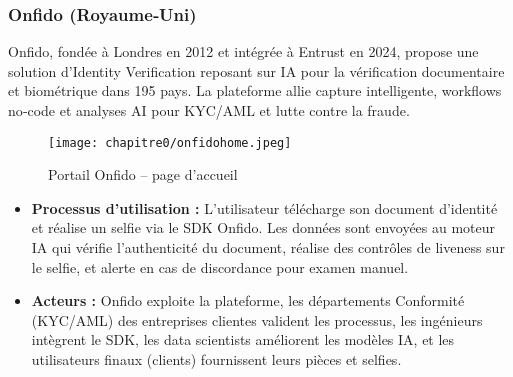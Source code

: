 \subsubsection{Onfido (Royaume‑Uni)}
Onfido\cite{b4,b36}, fondée à Londres en 2012 et intégrée à Entrust en 2024\cite{b37}, propose une solution d’Identity Verification reposant sur IA pour la vérification documentaire et biométrique dans 195 pays\cite{b36}. La plateforme allie capture intelligente, workflows no‑code et analyses AI pour KYC/AML et lutte contre la fraude\cite{b36}.\\
\begin{figure}[H]
  \centering
  \texttt{[image: chapitre0/onfidohome.jpeg]}
  \caption{Portail Onfido – page d’accueil}
\end{figure}
\begin{itemize}[label=\textbullet]
  \item \textbf{Processus d'utilisation :} L’utilisateur télécharge son document d’identité et réalise un selfie via le SDK Onfido\cite{b38}. Les données sont envoyées au moteur IA qui vérifie l’authenticité du document, réalise des contrôles de liveness sur le selfie, et alerte en cas de discordance pour examen manuel\cite{b37}.
  \item \textbf{Acteurs :} Onfido exploite la plateforme, les départements Conformité (KYC/AML) des entreprises clientes valident les processus, les ingénieurs intègrent le SDK, les data scientists améliorent les modèles IA, et les utilisateurs finaux (clients) fournissent leurs pièces et selfies\cite{b39}.
\end{itemize}

